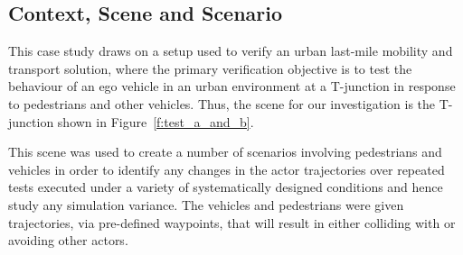 \documentclass[letterpaper, 10 pt, journal, twoside]{IEEEtran}
\begin{document}
\subsection{Context, Scene and Scenario}\label{TestsDescriptionAndTechnicalities}

This case study draws on a setup used to verify an urban last-mile mobility and transport solution, where the primary verification objective is to test the behaviour of an ego vehicle in an urban environment at a T-junction in response to pedestrians and other vehicles.
%
Thus, the scene for our investigation is the T-junction shown in Figure~\ref{f:test_a_and_b}.

This scene was used to create a number of scenarios involving pedestrians and vehicles in order to identify any changes in the actor trajectories over repeated tests executed under a variety of systematically designed conditions and hence study any simulation variance.
%
The vehicles and pedestrians were given trajectories, via pre-defined waypoints, that will result in either colliding with or avoiding other actors.
\end{document}
